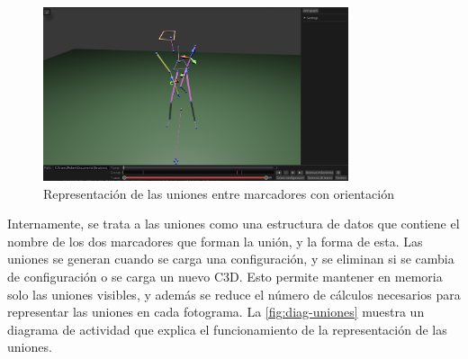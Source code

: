 \begin{figure}[H]
  \centering
  \includegraphics[width=0.8\textwidth]{imagenes/uniones-prisma.png}
  \caption{Representación de las uniones entre marcadores con orientación}
  \label{fig:uniones-prisma}
\end{figure}


Internamente, se trata a las uniones como una estructura de datos que contiene el nombre de los dos marcadores que forman la unión, y la forma de esta. Las uniones se generan cuando se carga una configuración, y se eliminan si se cambia de configuración o se carga un nuevo \ac{C3D}. Esto permite mantener en memoria solo las uniones visibles, y además se reduce el número de cálculos necesarios para representar las uniones en cada fotograma. La \autoref{fig:diag-uniones} muestra un diagrama de actividad que explica el funcionamiento de la representación de las uniones. 

